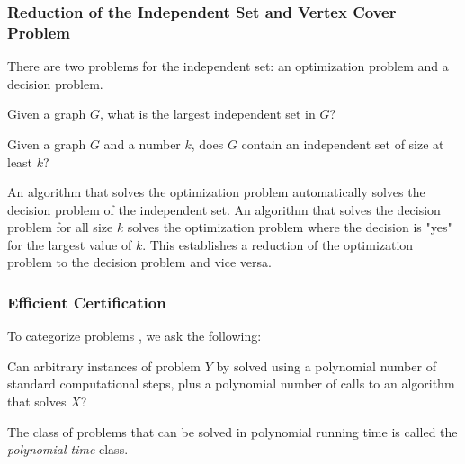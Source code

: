\subsubsection{Reduction of the Independent Set and Vertex Cover Problem}
There are two problems for the independent set: an optimization problem and a decision problem.
\begin{prob}
Given a graph $G$, what is the largest independent set in $G$?
\end{prob}
\begin{prob}
Given a graph $G$ and a number $k$, does $G$ contain an independent set of size at least $k$?
\end{prob}
An algorithm that solves the optimization problem automatically solves the decision problem of the independent set.  An algorithm that solves the decision problem for all size $k$ solves the optimization problem where the decision is "yes" for the largest value of $k$.  This establishes a reduction of the optimization problem to the decision problem and vice versa. 
\subsubsection{Efficient Certification}

To categorize problems \cite{kleinberg2006algorithm}, we ask the following:
\begin{prob}
Can arbitrary instances of problem $Y$ by solved using a polynomial number of standard computational steps, plus a polynomial number of calls to an algorithm that solves $X$?
\end{prob}
The class of problems that can be solved in polynomial running time is called the \textit{polynomial time} class.  
